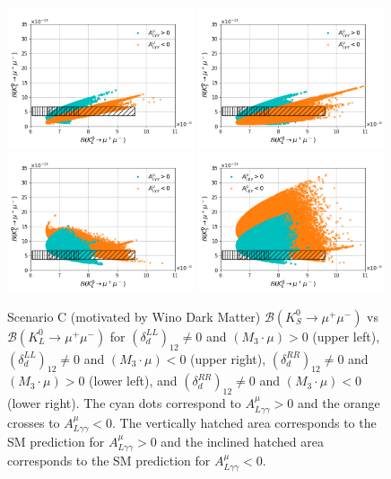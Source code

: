 \begin{figure}[h!]
\centering
\includegraphics[width=0.49\textwidth]{figs/figure_1_SCC_LL_pos.png}
\includegraphics[width=0.49\textwidth]{figs/figure_1_SCC_LL_neg.png}\\
\includegraphics[width=0.49\textwidth]{figs/figure_1_SCC_RR_pos.png}
\includegraphics[width=0.49\textwidth]{figs/figure_1_SCC_RR_neg.png}
\caption{\label{fig:BR_SCC} Scenario C (motivated by Wino Dark Matter) $\mathcal{B}(K_S^0\rightarrow\mu^+\mu^-)$ vs $\mathcal{B}(K_L^0\rightarrow\mu^+\mu^-)$ for $\left(\delta_{d}^{LL}\right)_{12}\neq 0$ and $(M_3\cdot\mu)>0$ (upper left), $\left(\delta_{d}^{LL}\right)_{12}\neq 0$ and $(M_3\cdot\mu)<0$ (upper right), $\left(\delta_{d}^{RR}\right)_{12}\neq 0$ and $(M_3\cdot\mu)>0$ (lower left), and $\left(\delta_{d}^{RR}\right)_{12}\neq 0$ and $(M_3\cdot\mu)<0$ (lower right). The cyan dots correspond to $A^\mu_{L\gamma \gamma} > 0$ and the orange crosses to $A^\mu_{L\gamma \gamma} < 0$. The vertically hatched area corresponds to the SM prediction for $A^\mu_{L\gamma \gamma} > 0$ and the inclined hatched area corresponds to the SM prediction for $A^\mu_{L\gamma \gamma} < 0$.}
\end{figure}


